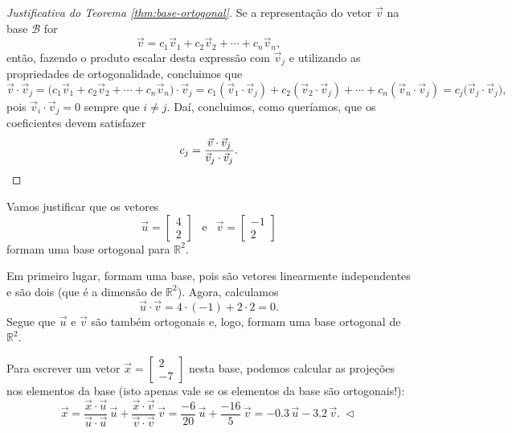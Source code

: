 \begin{proof}[Justificativa do Teorema \ref{thm:base-ortogonal}]
	Se a representação do vetor $\vec{v}$ na base $\mathcal{B}$ for
	\begin{equation}
	\vec{v} = c_1 \vec{v}_1 + c_2 \vec{v}_2 + \cdots + c_n \vec{v}_n,
	\end{equation} então, fazendo o produto escalar desta expressão com $\vec{v}_j$ e utilizando as propriedades de ortogonalidade, concluimos que
	\begin{equation}
	\vec{v} \cdot \vec{v}_j = \big( c_1 \vec{v}_1 + c_2 \vec{v}_2 + \cdots + c_n \vec{v}_n \big) \cdot \vec{v}_j = c_1 (\vec{v}_1\cdot \vec{v}_j) + c_2 (\vec{v}_2\cdot \vec{v}_j) + \cdots + c_n (\vec{v}_n\cdot \vec{v}_j) = c_j \big( \vec{v}_j \cdot \vec{v}_j \big),
	\end{equation} pois $\vec{v}_i \cdot \vec{v}_j = 0$ sempre que $i \neq j$. Daí, concluimos, como queríamos, que os coeficientes devem satisfazer
	\begin{equation}
	c_j = \frac{\vec{v} \cdot \vec{v}_j}{\vec{v}_j \cdot \vec{v}_j}. \qedhere
	\end{equation}
\end{proof}

\begin{ex}
	Vamos justificar que os vetores
	\begin{equation}
	\vec{u} =
	\begin{bmatrix}
	4 \\ 2
	\end{bmatrix} \ \ \text{ e }\ \
	\vec{v} =
	\begin{bmatrix}
	-1 \\ 2
	\end{bmatrix}
	\end{equation} formam uma base ortogonal para $\mathbb{R}^2$.

	Em primeiro lugar, formam uma base, pois são vetores linearmente independentes e são dois (que é a dimensão de $\mathbb{R}^2$). Agora, calculamos
	\begin{equation}
	\vec{u} \cdot \vec{v} = 4\cdot (-1) + 2\cdot 2 = 0.
	\end{equation} Segue que $\vec{u}$ e $\vec{v}$ são também ortogonais e, logo, formam uma base ortogonal de $\mathbb{R}^2$.

	Para escrever um vetor $\vec{x} =
	\begin{bmatrix}
	2 \\ -7
	\end{bmatrix}$ nesta base, podemos calcular as projeções nos elementos da base (isto apenas vale se os elementos da base são ortogonais!):
	\begin{equation}
	\vec{x} = \frac{\vec{x} \cdot \vec{u}}{\vec{u} \cdot \vec{u}} \, \vec{u} + \frac{\vec{x} \cdot \vec{v}}{\vec{v} \cdot \vec{v}} \, \vec{v} = \frac{-6}{20} \, \vec{u} + \frac{-16}{5} \, \vec{v} = -0.3 \, \vec{u} -3.2 \, \vec{v}. \ \lhd
	\end{equation}
\end{ex}


